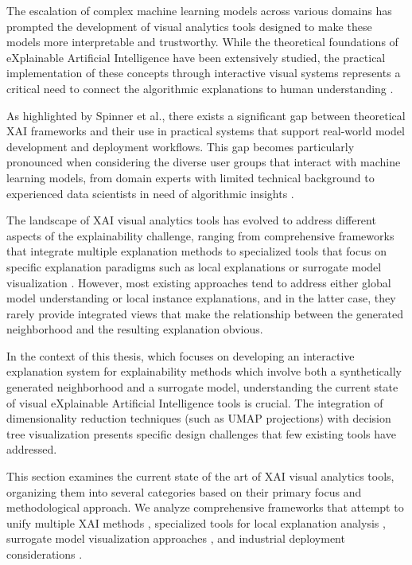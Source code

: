 

The escalation of complex machine learning models across various domains has prompted the development of visual analytics tools designed to make these models more interpretable and trustworthy. While the theoretical foundations of eXplainable Artificial Intelligence have been extensively studied, the practical implementation of these concepts through interactive visual systems represents a critical need to connect the algorithmic explanations to human understanding \cite{8807299,analytics4010007}.

As highlighted by Spinner et al.\cite{8807299}, there exists a significant gap between theoretical XAI frameworks and their use in practical systems that support real-world model development and deployment workflows. This gap becomes particularly pronounced when considering the diverse user groups that interact with machine learning models, from domain experts with limited technical background to experienced data scientists in need of algorithmic insights \cite{Z_ller_2023}.

The landscape of XAI visual analytics tools has evolved to address different aspects of the explainability challenge, ranging from comprehensive frameworks that integrate multiple explanation methods \cite{8807299} to specialized tools that focus on specific explanation paradigms such as local explanations \cite{9861728,cappuccio2024fipervisualbasedexplanationcombining} or surrogate model visualization \cite{Chatzimparmpas2023DeforestVisBA}. However, most existing approaches tend to address either global model understanding or local instance explanations, and in the latter case, they rarely provide integrated views that make the relationship between the generated neighborhood and the resulting explanation obvious.

In the context of this thesis, which focuses on developing an interactive explanation system for 
explainability methods which involve both a synthetically generated neighborhood and a surrogate model, 
understanding the current state of visual eXplainable Artificial Intelligence tools is crucial. The integration of dimensionality reduction techniques (such as UMAP projections) with decision tree visualization presents specific design challenges that few existing tools have addressed.

This section examines the current state of the art of XAI visual analytics tools, organizing them into several categories based on their primary focus and methodological approach. We analyze comprehensive frameworks that attempt to unify multiple XAI methods \cite{8807299,Z_ller_2023}, specialized tools for local explanation analysis \cite{9861728,cappuccio2024fipervisualbasedexplanationcombining}, surrogate model visualization approaches \cite{Chatzimparmpas2023DeforestVisBA}, and industrial deployment considerations \cite{analytics4010007}.


